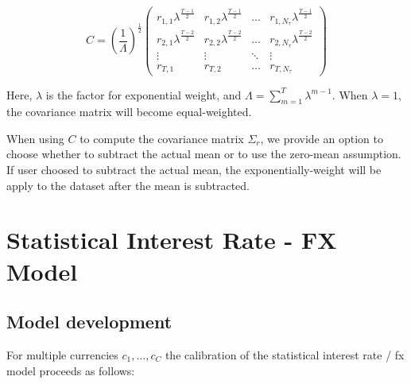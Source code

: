 \documentclass{amsart}
\theoremstyle{plain}
\numberwithin{equation}{section}
\begin{document}
\begin{equation}\label{cov_mat_decomp}
C =\left(\frac{1}{\Lambda}\right)^{\frac{1}{2}} \begin{pmatrix}
     r_{1,1} \lambda^{\frac{T-1}{2}} & r_{1,2} \lambda^{\frac{T-1}{2}} & \ldots & r_{1,N_\tau} \lambda^{\frac{T-1}{2}} \\
     r_{2,1} \lambda^{\frac{T-2}{2}} & r_{2,2} \lambda^{\frac{T-2}{2}} & \ldots & r_{2,N_\tau} \lambda^{\frac{T-2}{2}} \\
     \vdots & \vdots & \ddots & \vdots \\
     r_{T,1} & r_{T,2} & \ldots & r_{T,N_\tau}
     \end{pmatrix}
\end{equation}

Here, $\lambda$ is the factor for exponential weight, and $\Lambda=\sum_{m=1}^{T} \lambda^{m-1}$. When $\lambda=1$, the
covariance matrix will become equal-weighted.

When using $C$ to compute the covariance matrix $\Sigma_r$, we provide an option to choose whether to subtract the actual mean or to use the zero-mean assumption. If user choosed to subtract the actual mean, the exponentially-weight will be apply to the dataset after the mean is subtracted.

\section{Statistical Interest Rate - FX Model}

\subsection{Model development}

For multiple currencies $c_1,\ldots,c_C$ the calibration of the statistical interest rate / fx model proceeds as follows:
\end{document}
